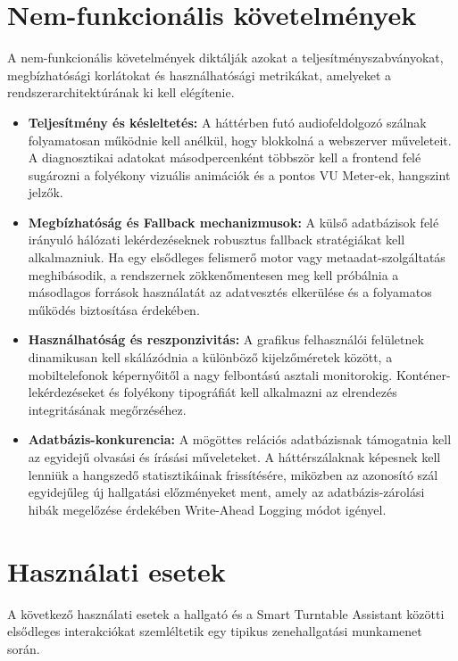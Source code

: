 \documentclass[12pt,a4paper,hungarian]{report}
\begin{document}
\section{Nem-funkcionális követelmények}

A nem-funkcionális követelmények diktálják azokat a teljesítményszabványokat, megbízhatósági korlátokat és használhatósági metrikákat, amelyeket a rendszerarchitektúrának ki kell elégítenie.

\begin{itemize}
    \item \textbf{Teljesítmény és késleltetés:} A háttérben futó audiofeldolgozó szálnak folyamatosan működnie kell anélkül, hogy blokkolná a webszerver műveleteit. A diagnosztikai adatokat másodpercenként többször kell a frontend felé sugározni a folyékony vizuális animációk és a pontos VU Meter-ek, hangszint jelzők.
    \item \textbf{Megbízhatóság és Fallback mechanizmusok:} A külső adatbázisok felé irányuló hálózati lekérdezéseknek robusztus fallback stratégiákat kell alkalmazniuk. Ha egy elsődleges felismerő motor vagy metaadat-szolgáltatás meghibásodik, a rendszernek zökkenőmentesen meg kell próbálnia a másodlagos források használatát az adatvesztés elkerülése és a folyamatos működés biztosítása érdekében.
    \item \textbf{Használhatóság és reszponzivitás:} A grafikus felhasználói felületnek dinamikusan kell skálázódnia a különböző kijelzőméretek között, a mobiltelefonok képernyőitől a nagy felbontású asztali monitorokig. Konténer-lekérdezéseket és folyékony tipográfiát kell alkalmazni az elrendezés integritásának megőrzéséhez.
    \item \textbf{Adatbázis-konkurencia:} A mögöttes relációs adatbázisnak támogatnia kell az egyidejű olvasási és írásási műveleteket. A háttérszálaknak képesnek kell lenniük a hangszedő statisztikáinak frissítésére, miközben az azonosító szál egyidejűleg új hallgatási előzményeket ment, amely az adatbázis-zárolási hibák megelőzése érdekében Write-Ahead Logging módot igényel.
\end{itemize}

\section{Használati esetek}

A következő használati esetek a hallgató és a Smart Turntable Assistant közötti elsődleges interakciókat szemléltetik egy tipikus zenehallgatási munkamenet során.
\end{document}
